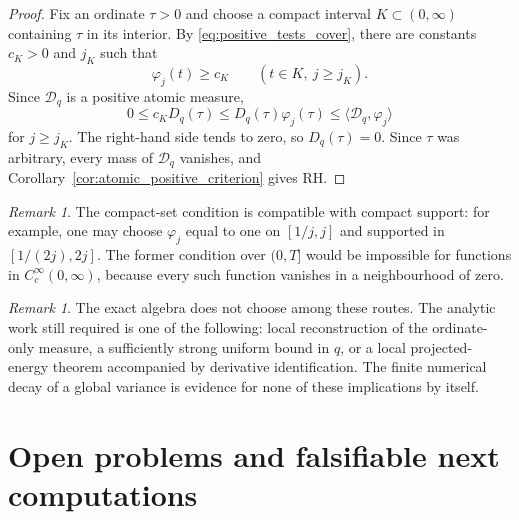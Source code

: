 \documentclass[11pt]{amsart}
\numberwithin{equation}{section}
\theoremstyle{plain}
\theoremstyle{definition}
\theoremstyle{remark}
\newtheorem{remark}[theorem]{Remark}
\newcommand{\RH}{\mathrm{RH}}
\newcommand{\1}{\mathbf{1}}
\begin{document}
\begin{proof}
Fix an ordinate \(\tau>0\) and choose a compact interval
\(K\subset(0,\infty)\) containing \(\tau\) in its interior.  By
\eqref{eq:positive_tests_cover}, there are constants \(c_K>0\) and
\(j_K\) such that
\begin{equation}
\varphi_j(t)\geq c_K
\qquad(t\in K,\ j\geq j_K).
\label{eq:positive_tests_uniform_lower_bound}
\end{equation}
Since \(\mathcal D_q\) is a positive atomic measure,
\begin{equation}
0\leq
c_KD_q(\tau)
\leq
D_q(\tau)\varphi_j(\tau)
\leq
\langle\mathcal D_q,\varphi_j\rangle
\label{eq:positive_tests_atom_bound}
\end{equation}
for \(j\geq j_K\).  The right-hand side tends to zero, so
\(D_q(\tau)=0\).  Since \(\tau\) was arbitrary, every mass of
\(\mathcal D_q\) vanishes, and Corollary~\ref{cor:atomic_positive_criterion}
gives \(\RH\).
\end{proof}

\begin{remark}
\label{rem:positive_test_existence}
The compact-set condition is compatible with compact support: for example,
one may choose \(\varphi_j\) equal to one on \([1/j,j]\) and supported in
\([1/(2j),2j]\).  The former condition over \((0,T]\) would be impossible
for functions in \(C_c^\infty(0,\infty)\), because every such function
vanishes in a neighbourhood of zero.
\end{remark}

\begin{remark}
\label{rem:routes_summary_missing_estimates}
The exact algebra does not choose among these routes.  The analytic work
still required is one of the following: local reconstruction of the
ordinate-only measure, a sufficiently strong uniform bound in \(q\), or a
local projected-energy theorem accompanied by derivative identification.
The finite numerical decay of a global variance is evidence for none of
these implications by itself.
\end{remark}


\section{Open problems and falsifiable next computations}
\label{sec:open_problems}
\end{document}
